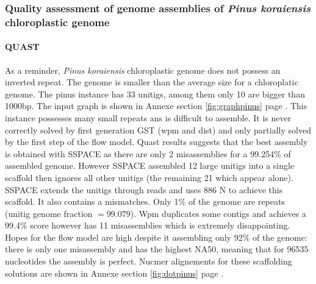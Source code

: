 \documentclass[12pt]{article}
\newcommand*{\fulleref}[1]{section \hyperref[{#1}] {\ref*{#1}} page {\pageref{#1}}}%
\begin{document}
\clearpage
\subsubsection{Quality assessment of genome assemblies of \textit{Pinus koraiensis} chloroplastic genome}

\paragraph*{QUAST}
As a reminder, \textit{Pinus koraiensis} chloroplastic genome does not possess an inverted repeat. The genome is smaller than the average size for a chloroplatic genome. The pinus instance has 33 unitigs, among them only 10 are bigger than 1000bp. The input graph is shown in Annexe \fulleref{fig:graphpinus}. This instance possesses many small repeats ans is difficult to assemble. It is never correctly solved by first generation GST (wpm and dist) and only partially solved by the first step of the flow model. Quast results suggests that the best assembly is obtained with SSPACE as there are only 2 misassemblies for a 99.254\% of assembled genome. However SSPACE assembled 12 large unitigs into a single scaffold then ignores all other unitigs (the remaining 21 which appear alone). SSPACE extends the unitigs through reads and uses 886 N to achieve this scaffold. It also contains a mismatches. Only 1\% of the genome are repeats (unitig genome fraction $=99.079$). Wpm duplicates some contigs and achieves a 99.4\% score however has 11 misassemblies which is extremely disappointing. Hopes for the flow model are high despite it assembling only 92\% of the genome: there is only one misassembly and has the highest NA50, meaning that for 96535 nucleotides the assembly is perfect. Nucmer alignements for these scaffolding solutions are shown in Annexe \fulleref{fig:dotpinus}.
\end{document}
